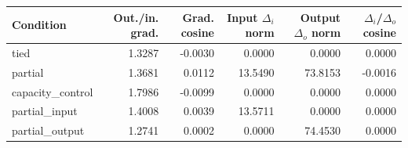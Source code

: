 \begin{tabular}{lrrrrr}
\toprule
Condition & Out./in. grad. & Grad. cosine & Input $\Delta_i$ norm & Output $\Delta_o$ norm & $\Delta_i$/$\Delta_o$ cosine \\
\midrule
tied & 1.3287 & -0.0030 & 0.0000 & 0.0000 & 0.0000 \\
partial & 1.3681 & 0.0112 & 13.5490 & 73.8153 & -0.0016 \\
capacity\_control & 1.7986 & -0.0099 & 0.0000 & 0.0000 & 0.0000 \\
partial\_input & 1.4008 & 0.0039 & 13.5711 & 0.0000 & 0.0000 \\
partial\_output & 1.2741 & 0.0002 & 0.0000 & 74.4530 & 0.0000 \\
\bottomrule
\end{tabular}
